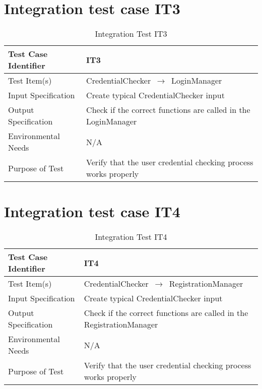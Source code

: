 \documentclass[../../testPlan.tex]{subfiles}
\begin{document}
		
	\section{Integration test case IT3}
		\begin{table}[H]
			\centering
			\label{IT3}
			\begin{tabular}{ll}
				\hline
				Test Case Identifier & IT3  \\ \hline
				Test Item(s)         & CredentialChecker $\,\to\,$ LoginManager\\ \hline
				Input Specification  & Create typical CredentialChecker input  \\ \hline
				Output Specification & Check if the correct functions are called in the LoginManager\\ \hline
				Environmental Needs  &  N/A \\ \hline
				Purpose of Test      &  Verify that the user credential checking process works properly\\ \hline
			\end{tabular}
			\caption{Integration Test IT3}
		\end{table}
		
		
	
	\section{Integration test case IT4}
		\begin{table}[H]
			\centering
			\label{IT4}
			\begin{tabular}{ll}
				\hline
				Test Case Identifier & IT4  \\ \hline
				Test Item(s)         & CredentialChecker $\,\to\,$ RegistrationManager\\ \hline
				Input Specification  & Create typical CredentialChecker input  \\ \hline
				Output Specification & Check if the correct functions are called in the RegistrationManager\\ \hline
				Environmental Needs  &  N/A \\ \hline
				Purpose of Test      &  Verify that the user credential checking process works properly\\ \hline
			\end{tabular}
			\caption{Integration Test IT4}
		\end{table}
		
	
\end{document}

